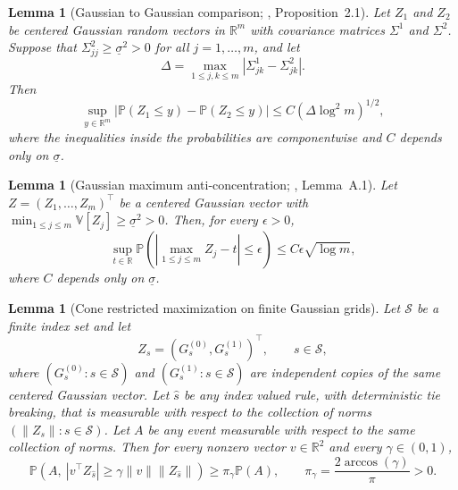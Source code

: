 \documentclass[10pt]{article}
\def\P{\mathbb{P}}
\def\V{\mathbb{V}}
\def\reals{\mathbb{R}}
\newtheorem{lemma}[theorem]{Lemma}
\theoremstyle{definition}
\theoremstyle{remark}
\begin{document}
\begin{lemma}[Gaussian to Gaussian comparison; \cite{chernozhukov2022improved}, Proposition~2.1]\label{sa-lem:gaussian-comparison}
Let $Z_1$ and $Z_2$ be centered Gaussian random vectors in $\reals^m$ with covariance matrices $\Sigma^1$ and $\Sigma^2$. Suppose that $\Sigma^2_{jj}\geq \underline{\sigma}^2>0$ for all $j=1,\ldots,m$, and let
\[
    \Delta=\max_{1\leq j,k\leq m}|\Sigma^1_{jk}-\Sigma^2_{jk}|.
\]
Then
\[
    \sup_{y\in\reals^m}
    \left|\P(Z_1\leq y)-\P(Z_2\leq y)\right|
    \leq
    C\left(\Delta\log^2 m\right)^{1/2},
\]
where the inequalities inside the probabilities are componentwise and $C$ depends only on $\underline{\sigma}$.
\end{lemma}

\begin{lemma}[Gaussian maximum anti-concentration; \cite{chernozhukov2017central}, Lemma~A.1]\label{sa-lem:gaussian-max-anti-concentration}
Let $Z=(Z_1,\ldots,Z_m)^\top$ be a centered Gaussian vector with
$\min_{1\leq j\leq m}\V[Z_j]\geq\underline{\sigma}^2>0$. Then, for every
$\epsilon>0$,
\[
    \sup_{t\in\mathbb R}
    \P\!\left(
        \left|\max_{1\leq j\leq m}Z_j-t\right|\leq\epsilon
    \right)
    \leq
    C\epsilon\sqrt{\log m},
\]
where $C$ depends only on $\underline{\sigma}$.
\end{lemma}

\begin{lemma}[Cone restricted maximization on finite Gaussian grids]\label{sa-lem:sse-cone-restricted-max}
Let $\mathcal S$ be a finite index set and let
\[
    Z_s=(G^{(0)}_s,G^{(1)}_s)^\top,\qquad s\in\mathcal S,
\]
where $(G^{(0)}_s:s\in\mathcal S)$ and $(G^{(1)}_s:s\in\mathcal S)$ are independent copies of the same centered Gaussian vector. Let $\hat s$ be any index valued rule, with deterministic tie breaking, that is measurable with respect to the collection of norms $(\|Z_s\|:s\in\mathcal S)$. Let $A$ be any event measurable with respect to the same collection of norms. Then for every nonzero vector $v\in\mathbb R^2$ and every $\gamma\in(0,1)$,
\[
    \P\!\left(
        A,\ |v^\top Z_{\hat s}|\geq \gamma\|v\|\|Z_{\hat s}\|
    \right)
    \geq
    \pi_\gamma \P(A),
    \qquad
    \pi_\gamma=\frac{2\operatorname{arccos}(\gamma)}{\pi}>0.
\]
\end{lemma}
\end{document}
